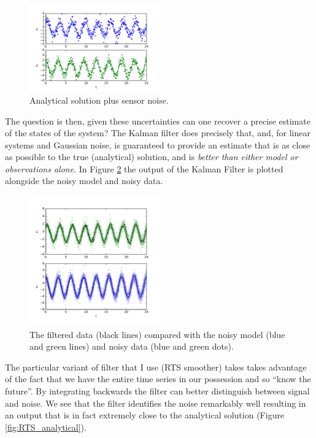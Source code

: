 \documentclass[12pt,oneside]{amsart}
\begin{document}
\begin{figure}[htbp]
\begin{center}
\includegraphics[width = 0.5\textwidth]{Figures/data}
\caption{Analytical solution plus sensor noise.}
\label{lab:sensor_noise}
\end{center}
\end{figure}

The question is then, given these uncertainties can one recover a precise estimate of the states of the system? The Kalman filter does precisely that, and, for linear systems and Gaussian noise, is guaranteed to provide an estimate that is as close as possible to the true (analytical) solution, and is \emph{better than either model or observations alone}. 
%
In Figure \ref{fig:RTS_stoch_data} the output of the Kalman Filter is plotted alongside the noisy model and noisy data. 


\begin{figure}[htbp]
\begin{center}
\includegraphics[width = 0.5\textwidth]{Figures/RTS_stoch_data}
\caption{The filtered data (black lines) compared with the noisy model (blue and green lines) and noisy data (blue and green dots).}
\label{fig:RTS_stoch_data}
\end{center}
\end{figure}


The particular variant of filter that I use (RTS smoother)   takes takes advantage of the fact that we have the entire time series in our possession and so ``know the future''. By integrating backwards the filter can better distinguish between signal and noise. We see that the filter identifies the noise remarkably well resulting in an output that is in fact extremely close to the analytical solution (Figure \ref{fig:RTS_analytical}).
\end{document}
